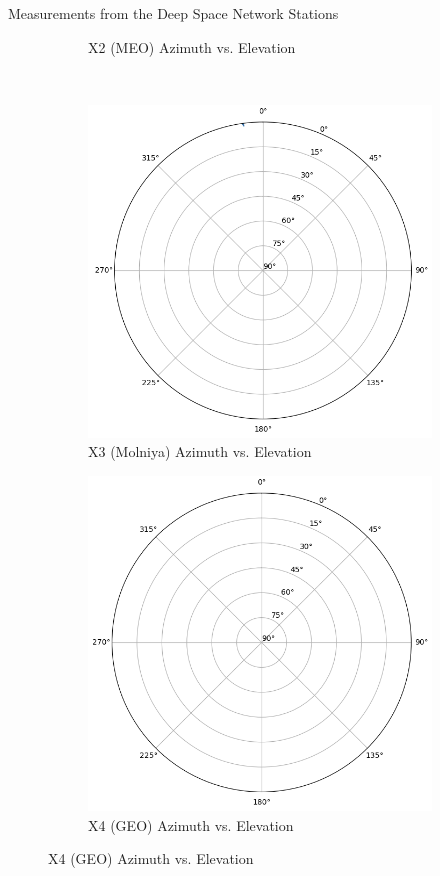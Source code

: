 \begin{hwkProblem}{4}{Measurements from the Deep Space Network Stations}
\begin{figure}[H]
\begin{center}
\begin{subfigure}{0.4\textwidth}
				\caption{X2 (MEO) Azimuth vs. Elevation}
			\end{subfigure}
			\\
			\begin{subfigure}{0.4\textwidth} \label{fig:s04a3}
				\includegraphics[width=\linewidth]{./outputs/figures/s04a3.png}
				\caption{X3 (Molniya) Azimuth vs. Elevation}
			\end{subfigure}
			\begin{subfigure}{0.4\textwidth} \label{fig:s04a4}
				\includegraphics[width=\linewidth]{./outputs/figures/s04a4.png}
				\caption{X4 (GEO) Azimuth vs. Elevation}
			\end{subfigure}
		\end{center}
	\end{figure}


\end{hwkProblem}
